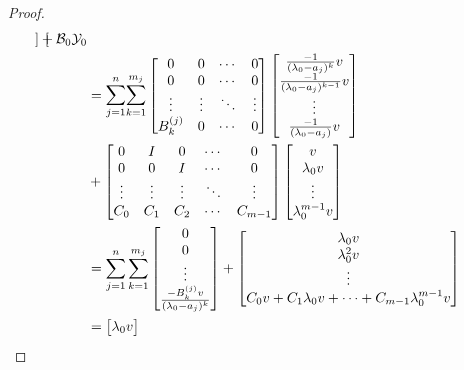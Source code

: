 \documentclass[12pt, reqno]{amsart}
\theoremstyle{definition}
\theoremstyle{remark}
\numberwithin{equation}{section}
\begin{document}
\begin{proof}
\begin{align}
\begin{bmatrix}
\end{bmatrix}+\mathcal{B}_0\mathcal{Y}_0 \nonumber \\
& =\mathlarger \sum_{j=1}^{n} \mathlarger \sum_{k=1}^{m_j} \begin{bmatrix}
    0 & 0 & \cdots & 0 \\
    0 & 0 & \cdots & 0 \\
    \vdots & \vdots & \ddots & \vdots \\
    B_k^{(j)} & 0 & \cdots & 0 \\
\end{bmatrix} \begin{bmatrix}
    \frac{-1}{(\lambda_0-a_j)^k}v\\
    \frac{-1}{(\lambda_0-a_j)^{k-1}}v\\
    \vdots\\
    \frac{-1}{(\lambda_0-a_j)}v\\
\end{bmatrix} \nonumber \\
&+ \begin{bmatrix}
    0 & I & 0 & \cdots & 0\\
    0 & 0 & I & \cdots & 0\\
    \vdots & \vdots & \vdots & \ddots & \vdots \\    
    C_0 & C_1 & C_2 & \cdots & C_{m-1}  
\end{bmatrix}\begin{bmatrix}
    v\\
    \lambda_0v\\
    \vdots\\
    \lambda_0^{m-1}v
\end{bmatrix} \nonumber \\
& = \sum_{j=1}^{n} \sum_{k=1}^{m_j} \begin{bmatrix}
    0\\
    0\\
    \vdots \\
    \frac{-B_k^{(j)}v}{(\lambda_0-a_j)^k}\\
\end{bmatrix}+\begin{bmatrix}
    \lambda_0v\\
    \lambda_0^2 v\\
    \vdots \\
    C_0v+C_1\lambda_0v+ \cdots + C_{m-1}\lambda_0^{m-1}v
\end{bmatrix} \nonumber\\ 
& =\begin{bmatrix}
    \lambda_0v\\

\end{bmatrix}
\end{align}
\end{proof}
\end{document}
